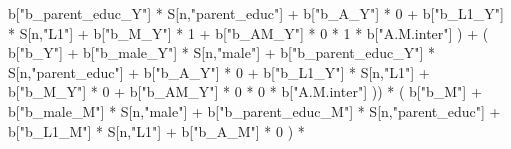 \documentclass[
]{book}
\newenvironment{Shaded}{\begin{snugshade}}{\end{snugshade}}
\newcommand{\DecValTok}[1]{\textcolor[rgb]{0.00,0.00,0.81}{#1}}
\newcommand{\NormalTok}[1]{#1}
\newcommand{\SpecialCharTok}[1]{\textcolor[rgb]{0.00,0.00,0.00}{#1}}
\newcommand{\StringTok}[1]{\textcolor[rgb]{0.31,0.60,0.02}{#1}}
\begin{document}
\begin{Shaded}
\begin{Highlighting}[]
\NormalTok{                                 b[}\StringTok{"b\_parent\_educ\_Y"}\NormalTok{] }\SpecialCharTok{*}\NormalTok{ S[n,}\StringTok{"parent\_educ"}\NormalTok{] }\SpecialCharTok{+} 
\NormalTok{                                 b[}\StringTok{"b\_A\_Y"}\NormalTok{] }\SpecialCharTok{*} \DecValTok{0} \SpecialCharTok{+} 
\NormalTok{                                 b[}\StringTok{"b\_L1\_Y"}\NormalTok{] }\SpecialCharTok{*}\NormalTok{ S[n,}\StringTok{"L1"}\NormalTok{] }\SpecialCharTok{+}
\NormalTok{                                 b[}\StringTok{"b\_M\_Y"}\NormalTok{] }\SpecialCharTok{*} \DecValTok{1} \SpecialCharTok{+}
\NormalTok{                                 b[}\StringTok{"b\_AM\_Y"}\NormalTok{] }\SpecialCharTok{*} \DecValTok{0} \SpecialCharTok{*} \DecValTok{1} \SpecialCharTok{*}\NormalTok{ b[}\StringTok{"A.M.inter"}\NormalTok{] ) }\SpecialCharTok{+} 
\NormalTok{                             ( b[}\StringTok{"b\_Y"}\NormalTok{] }\SpecialCharTok{+} 
\NormalTok{                                 b[}\StringTok{"b\_male\_Y"}\NormalTok{] }\SpecialCharTok{*}\NormalTok{ S[n,}\StringTok{"male"}\NormalTok{] }\SpecialCharTok{+} 
\NormalTok{                                 b[}\StringTok{"b\_parent\_educ\_Y"}\NormalTok{] }\SpecialCharTok{*}\NormalTok{ S[n,}\StringTok{"parent\_educ"}\NormalTok{] }\SpecialCharTok{+} 
\NormalTok{                                 b[}\StringTok{"b\_A\_Y"}\NormalTok{] }\SpecialCharTok{*} \DecValTok{0} \SpecialCharTok{+} 
\NormalTok{                                 b[}\StringTok{"b\_L1\_Y"}\NormalTok{] }\SpecialCharTok{*}\NormalTok{ S[n,}\StringTok{"L1"}\NormalTok{] }\SpecialCharTok{+}
\NormalTok{                                 b[}\StringTok{"b\_M\_Y"}\NormalTok{] }\SpecialCharTok{*} \DecValTok{0} \SpecialCharTok{+}
\NormalTok{                                 b[}\StringTok{"b\_AM\_Y"}\NormalTok{] }\SpecialCharTok{*} \DecValTok{0} \SpecialCharTok{*} \DecValTok{0} \SpecialCharTok{*}\NormalTok{ b[}\StringTok{"A.M.inter"}\NormalTok{] )) }\SpecialCharTok{*}
\NormalTok{      ( b[}\StringTok{"b\_M"}\NormalTok{] }\SpecialCharTok{+} 
\NormalTok{          b[}\StringTok{"b\_male\_M"}\NormalTok{] }\SpecialCharTok{*}\NormalTok{ S[n,}\StringTok{"male"}\NormalTok{] }\SpecialCharTok{+} 
\NormalTok{          b[}\StringTok{"b\_parent\_educ\_M"}\NormalTok{] }\SpecialCharTok{*}\NormalTok{ S[n,}\StringTok{"parent\_educ"}\NormalTok{] }\SpecialCharTok{+} 
\NormalTok{          b[}\StringTok{"b\_L1\_M"}\NormalTok{] }\SpecialCharTok{*}\NormalTok{ S[n,}\StringTok{"L1"}\NormalTok{] }\SpecialCharTok{+}
\NormalTok{          b[}\StringTok{"b\_A\_M"}\NormalTok{] }\SpecialCharTok{*} \DecValTok{0}\NormalTok{ ) }\SpecialCharTok{*} 

\end{Highlighting}
\end{Shaded}
\end{document}
